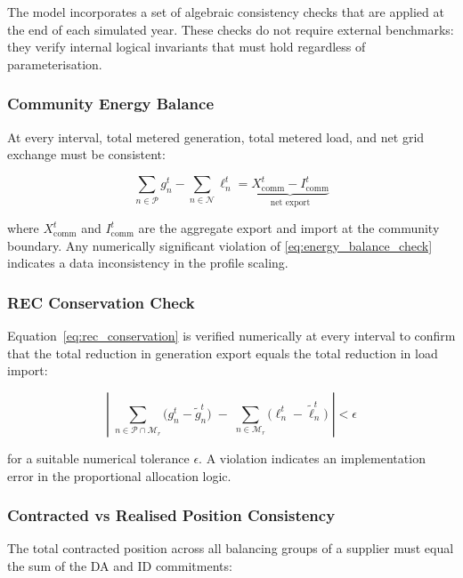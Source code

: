 \documentclass[12pt,a4paper]{article}
\begin{document}
The model incorporates a set of algebraic consistency checks that are applied
at the end of each simulated year.  These checks do not require external
benchmarks: they verify internal logical invariants that must hold regardless
of parameterisation.

\subsubsection{Community Energy Balance}

At every interval, total metered generation, total metered load, and net
grid exchange must be consistent:

\begin{equation}
\sum_{n \in \mathcal{P}} g_{n}^{t}
- \sum_{n \in \mathcal{N}} \ell_{n}^{t}
= \underbrace{X_{\mathrm{comm}}^{t} - I_{\mathrm{comm}}^{t}}_{\text{net export}}
\label{eq:energy_balance_check}
\end{equation}

where $X_{\mathrm{comm}}^{t}$ and $I_{\mathrm{comm}}^{t}$ are the aggregate
export and import at the community boundary.  Any numerically significant
violation of \cref{eq:energy_balance_check} indicates a data inconsistency
in the profile scaling.

\subsubsection{REC Conservation Check}

Equation~\cref{eq:rec_conservation} is verified numerically at every interval
to confirm that the total reduction in generation export equals the total
reduction in load import:

\begin{equation}
\left|\;
\sum_{n \in \mathcal{P} \cap \mathcal{M}_{r}}
\bigl(g_{n}^{t} - \tilde{g}_{n}^{t}\bigr)
\;-\;
\sum_{n \in \mathcal{M}_{r}}
\bigl(\ell_{n}^{t} - \tilde{\ell}_{n}^{t}\bigr)
\;\right| < \epsilon
\label{eq:rec_conservation_check}
\end{equation}

for a suitable numerical tolerance $\epsilon$.  A violation indicates an
implementation error in the proportional allocation logic.

\subsubsection{Contracted vs Realised Position Consistency}

The total contracted position across all balancing groups of a supplier must
equal the sum of the DA and ID commitments:
\end{document}
